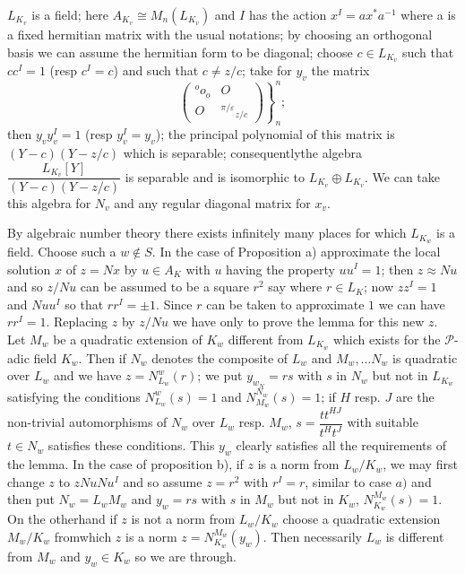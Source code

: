 \begin{romancase} %
$L_{K_v}$ is a field; here $A_{K_v} \cong M_n (L_{K_v})$ and $I$ has
  the action $x^I = ax^* a^{-1}$ where a is a fixed hermitian matrix
  with the usual notations; by choosing an orthogonal basis we can
  assume the hermitian form to be diagonal; choose $c \in L_{K_v}$
  such that $cc^{I} = 1$ (resp $c^{I} = c$) and such that $c \neq
  z/c$; take for $y_v$ the matrix 
$$
\left.  
\left(
\begin{array}{c|c}
{}^oo_o & O\\\hline
O & {}^{\pi/\varepsilon} {}_{z/c}
\end{array}
\right)
\right\}^n_n;
$$ then $y_v y_v^I = 1$
  (resp $y^I_v = y_v$); the principal polynomial of this
  matrix is $(Y - c) (Y - z/c)$ which is separable;
  consequently\pageoriginale the 
  algebra $\dfrac{L_{K_v} [Y]}{(Y-c)(Y-z/c)}$ is separable and is
  isomorphic to $L_{K_v} \oplus L_{K_v}$. We  can take this algebra
  for $N_v$ and any regular diagonal matrix for $x_v$. 
\end{romancase} 

\setcounter{proofoflem}{2}
\begin{proofoflem} %
By algebraic number theory there exists infinitely many places for
which $L_{K_w}$ is a field. Choose such a $w \notin S$. In the case of
Proposition a) approximate the local solution $x$ of $z = Nx$ by $u
\in A_K$ with $u$ having the property $uu^{I} =  1$; then $z
\approx Nu$ and so $z/Nu$ can be assumed to be a square $r^2$ say where
$r \in L_K$; now $zz^I = 1$ and $Nuu^I$ so that $rr^I = \pm 1$. Since
$r$ can be taken to approximate $1$ we can have $rr^I = 1$. Replacing
$z$ by $z/Nu$ we have only to prove the lemma for this new $z$. Let
$M_w$ be a quadratic extension of $K_w$ different from $L_{K_w}$ which
exists for the $\mathcal{P}$-adic field  $K_w$. Then if $N_w$ denotes
the composite of $L_w$ and $M_w, \ldots N_w$ is quadratic over $L_w$
and we have $z  = N_{L_w}^w (r)$; we put $y_{w_N} = rs$ with $s$ in
$N_w$ but not in $L_{K_w}$ satisfying the conditions $N_{L_w}^w (s) =
1$ and $N_{M_w}^{N_w}(s) = 1$; if $H$ resp. $J$ are the non-trivial
automorphisms of $N_w$ over $L_w$ resp. $M_w$, $s =
\dfrac{tt^{HJ}}{t^Ht^J}$ with suitable $t \in N_w$ satisfies these
conditions. This $y_w$ clearly satisfies all the requirements of the
lemma. In the case of proposition b), if $z$ is a norm from
$L_w/K_w$, we may first change $z$ to $zNu Nu^I$ and so assume $z =
r^2$ with $r^I = r$, similar to case $a)$ and then put $N_w = L_w M_w$
and $y_w = rs$ with $s$ in $M_w$ but not in $K_w$,  $N_{K_w}^{M_w}(s)
= 1$. On the otherhand if $z$ is not a norm from $L_w/K_w$ choose a
quadratic extension $M_w/K_w$ from\pageoriginale which $z$ is a norm $z =
N_{K_w}^{M_w} (y_w)$. Then necessarily $L_w$ is different from $M_w$
and $y_w \in K_w$ so we are through. 
\end{proofoflem}

